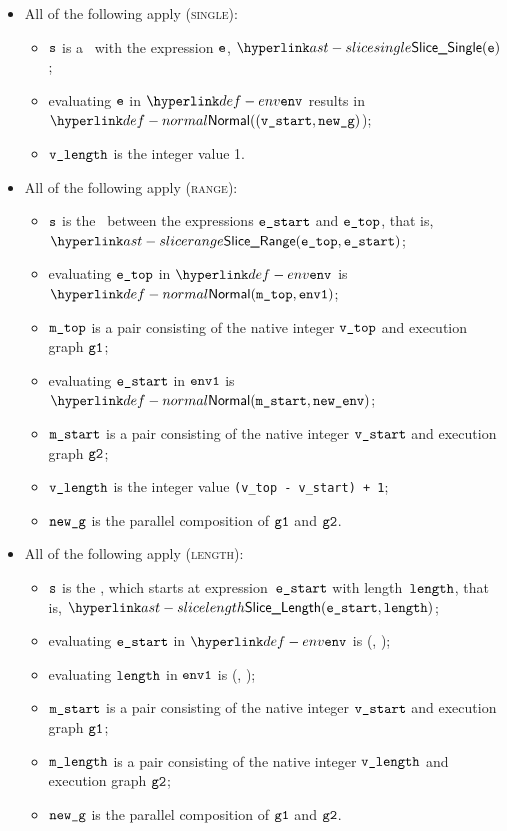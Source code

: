 \begin{itemize}
  \item All of the following apply (\textsc{single}):
  \begin{itemize}
    \item $\texttt{s}$ is a \singleslice\ with the expression $\texttt{e}$, $\SliceSingle(\ve)$;
    \item evaluating $\texttt{e}$ in $\env$ results in $\Normal((\vstart, \newg)$\newenv)\ProseOrAbnormal;
    \item $\texttt{v\_length}$ is the integer value 1.
  \end{itemize}

  \item All of the following apply (\textsc{range}):
  \begin{itemize}
    \item $\texttt{s}$ is the \rangeslice\ between the
      expressions $\texttt{e\_start}$ and $\texttt{e\_top}$, that is, \\ $\SliceRange(\etop, \estart)$;
    \item evaluating $\texttt{e\_top}$ in $\env$ is $\Normal(\mtop, \envone)$\ProseOrAbnormal;
    \item $\texttt{m\_top}$ is a pair consisting of the native integer $\texttt{v\_top}$ and execution graph $\texttt{g1}$;
    \item evaluating $\texttt{e\_start}$ in $\texttt{env1}$ is $\Normal(\mstart, \newenv)$\ProseOrAbnormal;
    \item $\texttt{m\_start}$ is a pair consisting of the native integer $\texttt{v\_start}$ and execution graph $\texttt{g2}$;
    \item $\texttt{v\_length}$ is the integer value \texttt{(v\_top - v\_start) + 1};
    \item $\texttt{new\_g}$ is the parallel composition of $\texttt{g1}$ and $\texttt{g2}$.
  \end{itemize}

  \item All of the following apply (\textsc{length}):
  \begin{itemize}
    \item $\texttt{s}$ is the \lengthslice, which starts at expression~$\texttt{e\_start}$ with length~$\texttt{length}$,
    that is, $\SliceLength(\estart, \elength)$;
    \item evaluating $\texttt{e\_start}$ in $\env$ is \Normal(\mstart, \envone)\ProseOrAbnormal;
    \item evaluating $\texttt{length}$ in $\texttt{env1}$ is \Normal(\mlength, \newenv)\ProseOrAbnormal;
    \item $\texttt{m\_start}$ is a pair consisting of the native integer $\texttt{v\_start}$ and execution graph $\texttt{g1}$;
    \item $\texttt{m\_length}$ is a pair consisting of the native integer $\texttt{v\_length}$ and execution graph $\texttt{g2}$;
    \item $\texttt{new\_g}$ is the parallel composition of $\texttt{g1}$ and $\texttt{g2}$.
  \end{itemize}


\end{itemize}
